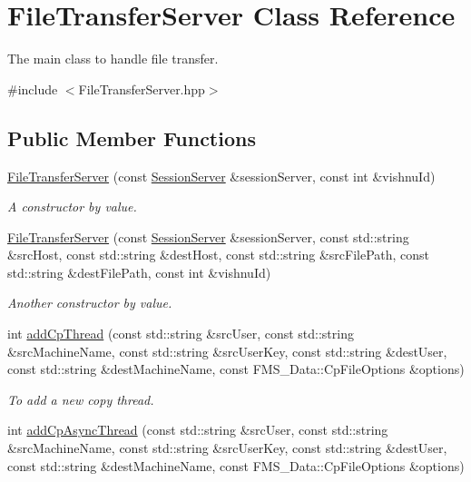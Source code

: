 \hypertarget{classFileTransferServer}{
\section{FileTransferServer Class Reference}
\label{classFileTransferServer}
}


The main class to handle file transfer.  




{\ttfamily \#include $<$FileTransferServer.hpp$>$}

\subsection*{Public Member Functions}
\begin{DoxyCompactItemize}
\item 
\hyperlink{classFileTransferServer_a77efa82bd50ff9948b405be91f6abeb7}{FileTransferServer} (const \hyperlink{classSessionServer}{SessionServer} \&sessionServer, const int \&vishnuId)
\begin{DoxyCompactList}\small\item\em A constructor by value. \item\end{DoxyCompactList}\item 
\hyperlink{classFileTransferServer_aaac9cbbc17f04ff77957adbabeaa958f}{FileTransferServer} (const \hyperlink{classSessionServer}{SessionServer} \&sessionServer, const std::string \&srcHost, const std::string \&destHost, const std::string \&srcFilePath, const std::string \&destFilePath, const int \&vishnuId)
\begin{DoxyCompactList}\small\item\em Another constructor by value. \item\end{DoxyCompactList}\item 
int \hyperlink{classFileTransferServer_a907124bdf656c0ba203d642414503f2f}{addCpThread} (const std::string \&srcUser, const std::string \&srcMachineName, const std::string \&srcUserKey, const std::string \&destUser, const std::string \&destMachineName, const FMS\_\-Data::CpFileOptions \&options)
\begin{DoxyCompactList}\small\item\em To add a new copy thread. \item\end{DoxyCompactList}\item 
int \hyperlink{classFileTransferServer_ac7c5eee613fd0ba56c69fb1372ed6909}{addCpAsyncThread} (const std::string \&srcUser, const std::string \&srcMachineName, const std::string \&srcUserKey, const std::string \&destUser, const std::string \&destMachineName, const FMS\_\-Data::CpFileOptions \&options)

\end{DoxyCompactItemize}
